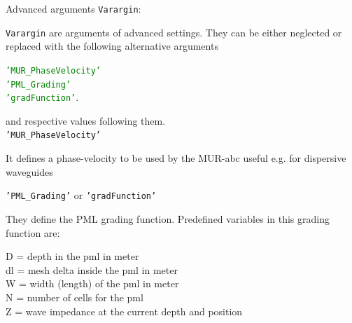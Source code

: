 	      Advanced arguments \texttt{Varargin}:
      \begin{myindentpar} \texttt{Varargin}  are  arguments of advanced settings. They can be either neglected or replaced with the following alternative arguments  
		\begin{myindentpar}
		  \textcolor{green}{\texttt{'MUR\_PhaseVelocity'}}\\
		  \textcolor{green}{\texttt{'PML\_Grading'}}\\
		  \textcolor{green}{\texttt{'gradFunction'}}.
		\end{myindentpar}
      and respective values following them.\vspace{2mm}\\
		\texttt{'MUR\_PhaseVelocity'} 
		  \begin{myindentpar}
		      It defines a phase-velocity to be used by the MUR-abc
		      useful e.g. for dispersive waveguides
		  \end{myindentpar}
	    \vspace{2mm} 
	      \texttt{'PML\_Grading'} or \texttt{'gradFunction'} 
		\begin{myindentpar}
		They define the PML grading function.\vspace{2mm}
			    Predefined variables in this grading function are:
			      \begin{myindentpar}
				D  = depth in the pml in meter\\
				dl = mesh delta inside the pml in meter\\
				W  = width (length) of the pml in meter\\
				N  = number of cells for the pml\\
				Z  = wave impedance at the current depth and position
			    \end{myindentpar}
		\end{myindentpar}
      \end{myindentpar}

